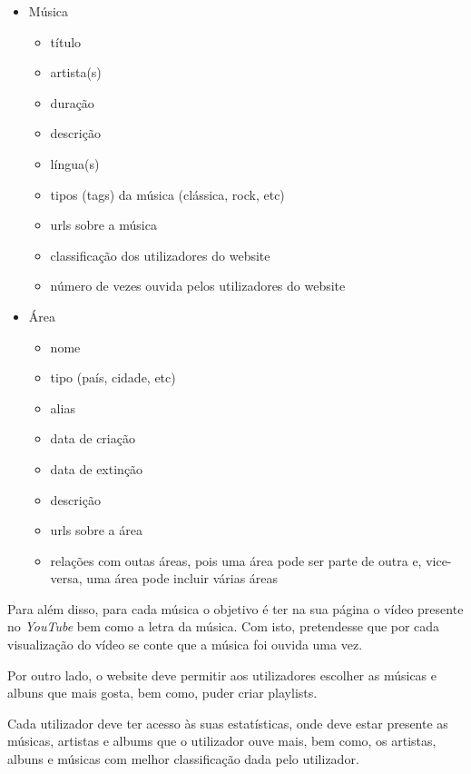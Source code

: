 \documentclass{article}
\begin{document}
\begin{itemize}
\begin{itemize}
        \end{itemize}
    \item Música
        \begin{itemize}
            \item título
            \item artista(s)
            \item duração
            \item descrição
            \item língua(s)
            \item tipos (tags) da música (clássica, rock, etc)
            \item urls sobre a música
            \item classificação dos utilizadores do website
            \item número de vezes ouvida pelos utilizadores do website
        \end{itemize}
    \item Área
        \begin{itemize}
            \item nome
            \item tipo (país, cidade, etc)
            \item alias
            \item data de criação
            \item data de extinção
            \item descrição
            \item urls sobre a área
            \item relações com outas áreas, pois uma área pode ser parte de outra e, vice-versa, uma área pode incluir várias áreas
        \end{itemize}
\end{itemize}

Para além disso, para cada música o objetivo é ter na sua página o vídeo presente no \textit{YouTube} bem como a letra da música. Com isto, pretendesse que por cada visualização do vídeo se conte que a música foi ouvida uma vez.

Por outro lado, o website deve permitir aos utilizadores escolher as músicas e albuns que mais gosta, bem como, puder criar playlists.

Cada utilizador deve ter acesso às suas estatísticas, onde deve estar presente as músicas, artistas e albums que o utilizador ouve mais, bem como, os artistas, albuns e músicas com melhor classificação dada pelo utilizador.
\end{document}
